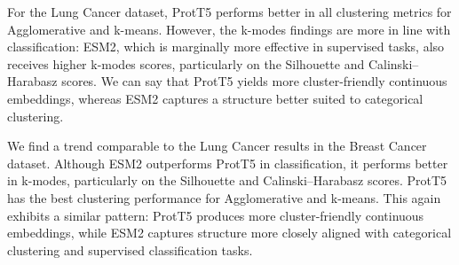 \documentclass[]{Liebert_Author_revised}
\begin{document}
For the Lung Cancer dataset, ProtT5 performs better in all clustering metrics for Agglomerative and k-means. However, the k-modes findings are more in line with classification: ESM2, which is marginally more effective in supervised tasks, also receives higher k-modes scores, particularly on the Silhouette and Calinski–Harabasz scores. We can say that ProtT5 yields more cluster-friendly continuous embeddings, whereas ESM2 captures a structure better suited to categorical clustering.


We find a trend comparable to the Lung Cancer results in the Breast Cancer dataset. Although ESM2 outperforms ProtT5 in classification, it performs better in k-modes, particularly on the Silhouette and Calinski–Harabasz scores. ProtT5 has the best clustering performance for Agglomerative and k-means. This again exhibits a similar pattern: ProtT5 produces more cluster-friendly continuous embeddings, while ESM2 captures structure more closely aligned with categorical clustering and supervised classification tasks.

\end{document}
